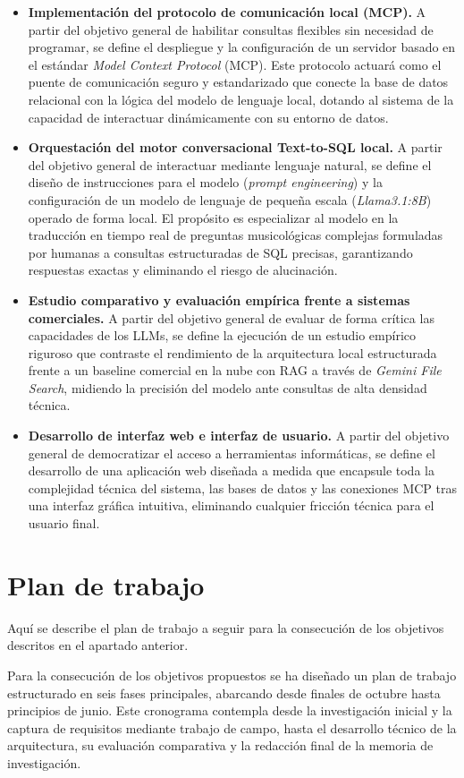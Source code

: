 \begin{itemize}
    \item \textbf{Implementación del protocolo de comunicación local (MCP).} A partir del objetivo general de habilitar consultas flexibles sin necesidad de programar, se define el despliegue y la configuración de un servidor basado en el estándar \textit{Model Context Protocol} (MCP). Este protocolo actuará como el puente de comunicación seguro y estandarizado que conecte la base de datos relacional con la lógica del modelo de lenguaje local, dotando al sistema de la capacidad de interactuar dinámicamente con su entorno de datos.
    \item \textbf{Orquestación del motor conversacional Text-to-SQL local.} A partir del objetivo general de interactuar mediante lenguaje natural, se define el diseño de instrucciones para el modelo (\textit{prompt engineering}) y la configuración de un modelo de lenguaje de pequeña escala (\textit{Llama3.1:8B}) operado de forma local. El propósito es especializar al modelo en la traducción en tiempo real de preguntas musicológicas complejas formuladas por humanas a consultas estructuradas de SQL precisas, garantizando respuestas exactas y eliminando el riesgo de alucinación.
    \item \textbf{Estudio comparativo y evaluación empírica frente a sistemas comerciales.} A partir del objetivo general de evaluar de forma crítica las capacidades de los LLMs, se define la ejecución de un estudio empírico riguroso que contraste el rendimiento de la arquitectura local estructurada frente a un baseline comercial en la nube con RAG a través de \textit{Gemini File Search}, midiendo la precisión del modelo ante consultas de alta densidad técnica.
    \item \textbf{Desarrollo de interfaz web e interfaz de usuario.} A partir del objetivo general de democratizar el acceso a herramientas informáticas, se define el desarrollo de una aplicación web diseñada a medida que encapsule toda la complejidad técnica del sistema, las bases de datos y las conexiones MCP tras una interfaz gráfica intuitiva, eliminando cualquier fricción técnica para el usuario final.
\end{itemize}

\section{Plan de trabajo}
Aquí se describe el plan de trabajo a seguir para la consecución de los objetivos descritos en el apartado anterior.

Para la consecución de los objetivos propuestos se ha diseñado un plan de trabajo estructurado en seis fases principales, abarcando desde finales de octubre hasta principios de junio. Este cronograma contempla desde la investigación inicial y la captura de requisitos mediante trabajo de campo, hasta el desarrollo técnico de la arquitectura, su evaluación comparativa y la redacción final de la memoria de investigación.

